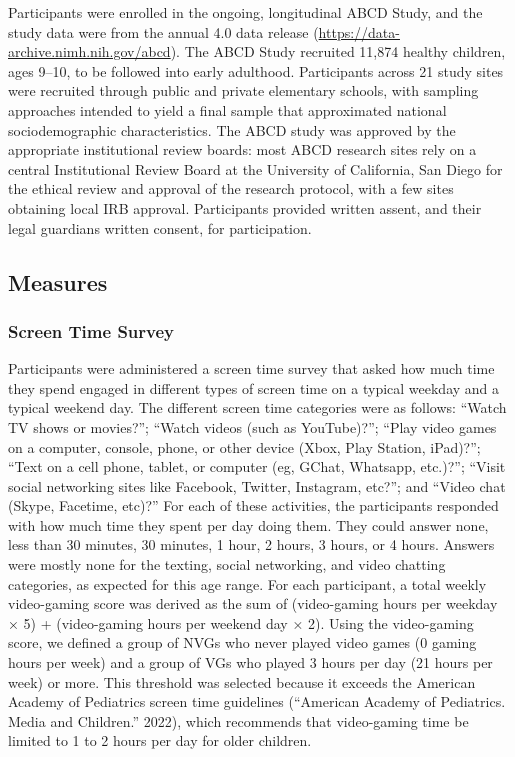 \documentclass{article}
\begin{document}
Participants were enrolled in the ongoing, longitudinal ABCD Study, and
the study data were from the annual 4.0 data release
(\url{https://data-archive.nimh.nih.gov/abcd}). The ABCD Study recruited
11,874 healthy children, ages 9--10, to be followed into early
adulthood. Participants across 21 study sites were recruited through
public and private elementary schools, with sampling approaches intended
to yield a final sample that approximated national sociodemographic
characteristics. The ABCD study was approved by the appropriate
institutional review boards: most ABCD research sites rely on a central
Institutional Review Board at the University of California, San Diego
for the ethical review and approval of the research protocol, with a few
sites obtaining local IRB approval. Participants provided written
assent, and their legal guardians written consent, for participation.

\hypertarget{measures}{%
\subsection{Measures}\label{measures}}

\hypertarget{screen-time-survey}{%
\subsubsection{Screen Time Survey}\label{screen-time-survey}}

Participants were administered a screen time survey that asked how much
time they spend engaged in different types of screen time on a typical
weekday and a typical weekend day. The different screen time categories
were as follows: ``Watch TV shows or movies?''; ``Watch videos (such as
YouTube)?''; ``Play video games on a computer, console, phone, or other
device (Xbox, Play Station, iPad)?''; ``Text on a cell phone, tablet, or
computer (eg, GChat, Whatsapp, etc.)?''; ``Visit social networking sites
like Facebook, Twitter, Instagram, etc?''; and ``Video chat (Skype,
Facetime, etc)?'' For each of these activities, the participants
responded with how much time they spent per day doing them. They could
answer none, less than 30 minutes, 30 minutes, 1 hour, 2 hours, 3 hours,
or 4 hours. Answers were mostly none for the texting, social networking,
and video chatting categories, as expected for this age range. For each
participant, a total weekly video-gaming score was derived as the sum of
(video-gaming hours per weekday × 5) + (video-gaming hours per weekend
day × 2). Using the video-gaming score, we defined a group of NVGs who
never played video games (0 gaming hours per week) and a group of VGs
who played 3 hours per day (21 hours per week) or more. This threshold
was selected because it exceeds the American Academy of Pediatrics
screen time guidelines ({``American {Academy} of {Pediatrics}. {Media}
and Children.''} 2022), which recommends that video-gaming time be
limited to 1 to 2 hours per day for older children.
\end{document}
